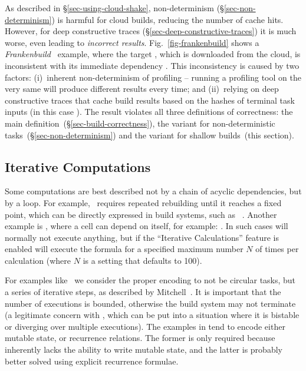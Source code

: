 As described in \S\ref{sec-using-cloud-shake}, non-determinism
(\S\ref{sec-non-determinism}) is harmful for cloud builds, reducing the number
of cache hits. However, for deep constructive traces
(\S\ref{sec-deep-constructive-traces}) it is much worse, even leading to
\emph{incorrect results}. Fig.~\ref{fig-frankenbuild} shows a
\emph{Frankenbuild}~\cite{esfahani2016cloudbuild} example, where the target
, which is downloaded from the cloud, is inconsistent with its
immediate dependency . This inconsistency is caused by two factors:
(i)~inherent non-determinism of profiling -- running a profiling tool on the very
same  will produce different  results every time;
and (ii)~relying on deep constructive traces that cache build results based
on the hashes of terminal task inputs (in this case ). The result
violates all three definitions of correctness: the main
definition~(\S\ref{sec-build-correctness}), the variant for non-deterministic
tasks~(\S\ref{sec-non-determinism}) and the variant for shallow
builds~(this section).


\vspace{-1mm}
\subsection{Iterative Computations}\label{sec-iterative-compute}

Some computations are best described not by a chain of acyclic dependencies,
but by a loop. For example, \Latex~requires repeated rebuilding until it
reaches a fixed point, which can be directly expressed in build systems, such as
\Pluto~\cite{erdweg2015pluto}. Another example is \Excel, where a cell can
depend on itself, for example: . In such cases \Excel will
normally not execute anything, but if the ``Iterative Calculations'' feature is
enabled \Excel will execute the formula for a specified maximum number $N$ of
times per calculation (where $N$ is a setting that defaults to 100).

For examples like \Latex~we consider the proper encoding to not be circular
tasks, but a series of iterative steps, as described by
Mitchell~. It is important that the number of
executions is bounded, otherwise the build system may not terminate (a
legitimate concern with \Latex, which can be put into a situation where it is
bistable or diverging over multiple executions). The examples in \Excel tend to
encode either mutable state, or recurrence relations. The former is only
required because \Excel inherently lacks the ability to write mutable state, and
the latter is probably better solved using explicit recurrence formulae.

